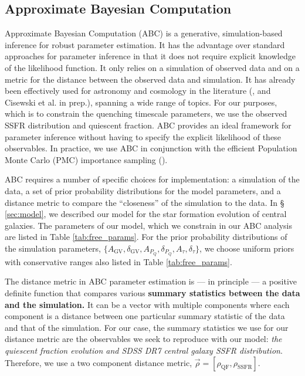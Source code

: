 \documentclass[iop,apj,tighten,twocolappendix,numberedappendix]{emulateapj}
\begin{document}
\subsection{Approximate Bayesian Computation} \label{sec:abc}
Approximate Bayesian Computation (ABC) is a generative, 
simulation-based inference for robust parameter estimation. 
It has the advantage over standard approaches for parameter 
inference in that it does not require explicit knowledge 
of the likelihood function. It only relies on a simulation 
of observed data and on a metric for the distance between 
the observed data and simulation. It has already been 
effectively used for astronomy and cosmology in the literature 
(\citealt{Cameron:2012aa, Weyant:2013aa, Akeret:2015aa, 
Ishida:2015aa, Lin:2015aa, Lin:2016aa, Hahn:2016aa}, and 
Cisewski et al. in prep.), spanning a wide range of topics.
For our purposes, which is to constrain the quenching timescale 
parameters, we use the observed SSFR distribution and quiescent 
fraction. ABC provides an ideal framework for parameter inference 
without having to specify the explicit likelihood of these 
observables. In practice, we use 
ABC in conjunction with the efficient 
Population Monte Carlo (PMC) importance sampling 
(\citealt{Ishida:2015aa, Hahn:2016aa}). 

ABC requires a number of specific choices for implementation: a 
simulation of the data, a set of prior probability distributions 
for the model parameters, and a distance metric to compare the 
``closeness'' of the simulation to the data. In \S 
\ref{sec:model}, we described our model for the star formation 
evolution of central galaxies. The parameters of our model, which we 
constrain in our ABC analysis are listed in Table \ref{tab:free_params}. 
For the prior probability distributions of the simulation parameters, 
$\{A_\mathrm{GV}, \delta_\mathrm{GV}, A_{P_Q}, \delta_{P_Q}, A_\tau, 
\delta_\tau \}$, we choose uniform priors with conservative ranges also 
listed in Table \ref{tab:free_params}. 

The distance metric in ABC parameter estimation is --- in principle --- a
positive definite function that compares various {\color{red} \bf summary statistics
between the data and the simulation.} It can be a vector with multiple 
components where each component is a distance between one particular 
summary statistic of the data and that of the simulation. For our case, 
the summary statistics we use for our distance metric are the observables
we seek to reproduce with our model: {\em the quiescent fraction evolution and 
SDSS DR7 central galaxy SSFR distribution}. Therefore, we use a two component 
distance metric, $\vec\rho = [\rho_\mathrm{QF}, \rho_\mathrm{SSFR}]$. 
\end{document}

